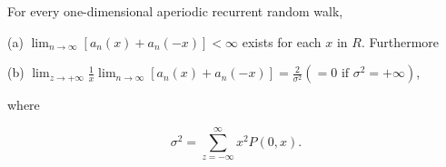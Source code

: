 For every one-dimensional aperiodic recurrent random walk,

(a) $\lim_{n \to \infty} [a_n(x) + a_n(-x)] < \infty$ exists for each $x$ in $R$. Furthermore

(b) $\lim_{z \to +\infty} \frac{1}{x} \lim_{n \to \infty} [a_n(x) + a_n(-x)] = \frac{2}{\sigma^2} (= 0 \text{ if } \sigma^2 = +\infty)$,

where

$$\sigma^2 = \sum_{z=-\infty}^{\infty} x^2 P(0,x).$$
